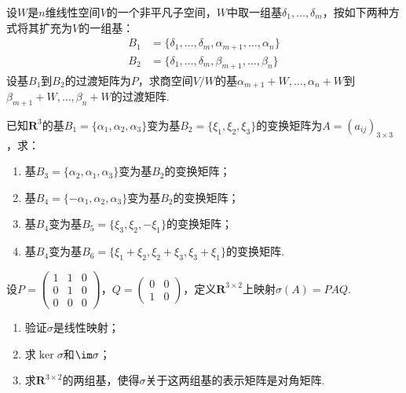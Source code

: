 \begin{exercise}
    \begin{exgroup}
        \item 设$W$是$n$维线性空间$V$的一个非平凡子空间，$W$中取一组基$\delta_1,\ldots,\delta_m$，按如下两种方式将其扩充为$V$的一组基：
        \begin{align*}
            B_1 & =\{\delta_1,\ldots,\delta_m,\alpha_{m+1},\ldots,\alpha_n\} \\
            B_2 & =\{\delta_1,\ldots,\delta_m,\beta_{m+1},\ldots,\beta_n\}
        \end{align*}
        设基$B_1$到$B_2$的过渡矩阵为$P$，求商空间$V/W$的基$\alpha_{m+1}+W,\ldots,\alpha_n+W$到$\beta_{m+1}+W,\ldots,\beta_n+W$的过渡矩阵.

        \item 已知$\mathbf{R}^3$的基$B_1=\{\alpha_1,\alpha_2,\alpha_3\}$变为基$B_2=\{\xi_1,\xi_2,\xi_3\}$的变换矩阵为$A=(a_{ij})_{3 \times 3}$，求：
        \begin{enumerate}
            \item 基$B_3=\{\alpha_2,\alpha_1,\alpha_3\}$变为基$B_2$的变换矩阵；

            \item 基$B_4=\{-\alpha_1,\alpha_2,\alpha_3\}$变为基$B_2$的变换矩阵；

            \item 基$B_4$变为基$B_5=\{\xi_3,\xi_2,-\xi_1\}$的变换矩阵；

            \item 基$B_4$变为基$B_6=\{\xi_1+\xi_2,\xi_2+\xi_3,\xi_3+\xi_1\}$的变换矩阵.
        \end{enumerate}

        \item 设$P=\begin{pmatrix}
                1 & 1 & 0 \\ 0 & 1 & 0 \\ 0 & 0 & 0
            \end{pmatrix}$，$Q=\begin{pmatrix}
                0 & 0 \\ 1 & 0
            \end{pmatrix}$，定义$\mathbf{R}^{3\times 2}$上映射$\sigma(A)=PAQ$.
        \begin{enumerate}
            \item 验证$\sigma$是线性映射；

            \item 求$\ker\sigma$和$\im \sigma$；

            \item 求$\mathbf{R}^{3\times 2}$的两组基，使得$\sigma$关于这两组基的表示矩阵是对角矩阵.
        \end{enumerate}


\end{exgroup}
\end{exercise}
